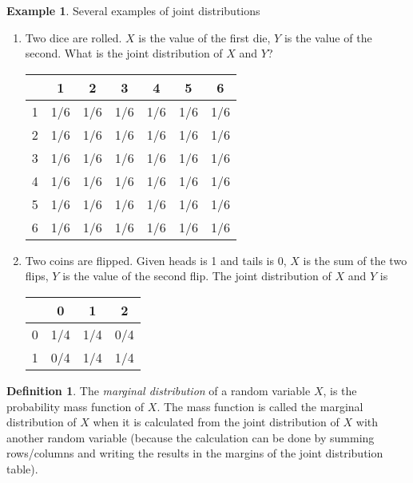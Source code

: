 \documentclass[12pt]{article}
\renewcommand{\_}[1]{\underline{ #1 }}
\theoremstyle{definition}
\newtheorem{definition}[theorem]{Definition}
\newtheorem{example}[theorem]{Example}
\numberwithin{equation}{subsection}
\begin{document}
\begin{example} Several examples of joint distributions
	\begin{enumerate}
		\item Two dice are rolled. $X$ is the value of the first die, $Y$ is the value of the second. What is the joint distribution of $X$ and $Y$? \\
		\begin{center}
			\begin{tabular}{ c | c | c | c | c | c | c | }
				& 1 & 2 & 3 & 4 & 5 & 6 \\
				\hline
				1 & 1/6 & 1/6 & 1/6 & 1/6 & 1/6 & 1/6 \\
				\hline
				2 & 1/6 & 1/6 & 1/6 & 1/6 & 1/6 & 1/6 \\
				\hline
				3 & 1/6 & 1/6 & 1/6 & 1/6 & 1/6 & 1/6 \\
				\hline
				4 & 1/6 & 1/6 & 1/6 & 1/6 & 1/6 & 1/6 \\
				\hline
				5 & 1/6 & 1/6 & 1/6 & 1/6 & 1/6 & 1/6 \\
				\hline
				6 & 1/6 & 1/6 & 1/6 & 1/6 & 1/6 & 1/6 \\
				\hline
			\end{tabular}
		\end{center}
		
		\item Two coins are flipped. Given heads is 1 and tails is 0, $X$ is the sum of the two flips, $Y$ is the value of the second flip. The joint distribution of $X$ and $Y$ is \\
		\begin{center}			
			\begin{tabular}{ c | c | c | c | }
				& 0 & 1 & 2 \\
				\hline
				0 & 1/4 & 1/4 & 0/4 \\
				\hline
				1 & 0/4 & 1/4 & 1/4 \\
				\hline
			\end{tabular}
		\end{center}
	\end{enumerate}
\end{example}

\begin{definition} 
	The \emph{marginal distribution} of a random variable $X$, is the probability mass function of $X$. The mass function is called the marginal distribution of $X$ when it is calculated from the joint distribution of $X$ with another random variable (because the calculation can be done by summing rows/columns and writing the results in the margins of the joint distribution table).
\end{definition} 
\end{document}
